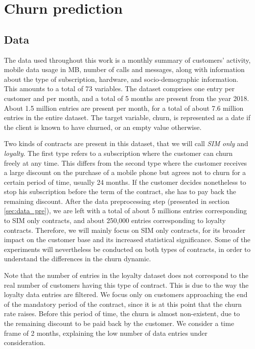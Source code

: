 \chapter{Churn prediction}
\label{ch:churn}

\section{Data}
\label{sec:churn_data}

The data used throughout this work is a monthly summary of customers' activity,
mobile data usage in MB, number of calls and messages, along with information
about the type of subscription, hardware, and socio-demographic information.
This amounts to a total of 73 variables. The dataset comprises one entry per
customer and per month, and a total of 5 months are present from the year 2018.
About 1.5 million entries are present per month, for a total of about 7.6
million entries in the entire dataset. The target variable, churn, is
represented as a date if the client is known to have churned, or an empty value
otherwise.

Two kinds of contracts are present in this dataset, that we will call \emph{SIM
only} and \emph{loyalty}. The first type refers to a subscription where the
customer can churn freely at any time. This differs from the second type where
the customer receives a large discount on the purchase of a mobile phone but
agrees not to churn for a certain period of time, usually 24 months. If the
customer decides nonetheless to stop his subscription before the term of the
contract, she has to pay back the remaining discount. After the data
preprocessing step (presented in section \ref{sec:data_pre}), we are left with a
total of about 5 millions entries corresponding to SIM only contracts, and about
250,000 entries corresponding to loyalty contracts. Therefore, we will mainly
focus on SIM only contracts, for its broader impact on the customer base and its
increased statistical significance. Some of the experiments will nevertheless be
conducted on both types of contracts, in order to understand the differences in
the churn dynamic.

Note that the number of entries in the loyalty dataset does not correspond to
the real number of customers having this type of contract. This is due to the
way the loyalty data entries are filtered. We focus only on customers
approaching the end of the mandatory period of the contract, since it is at
this point that the churn rate raises. Before this period of time, the churn is
almost non-existent, due to the remaining discount to be paid back by the
customer. We consider a time frame of 2 months, explaining the low number of
data entries under consideration.

